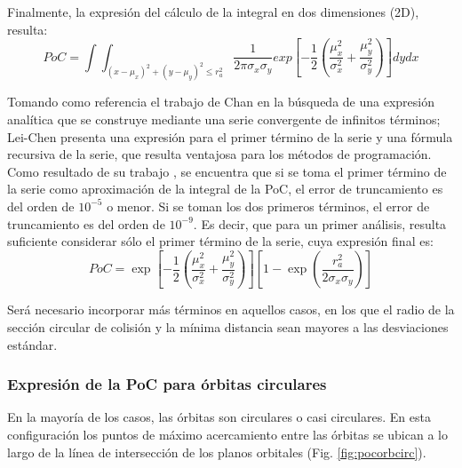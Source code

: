 Finalmente, la expresi\'on del c\'alculo de la integral en dos dimensiones (2D), resulta:\\

\begin{equation}
 PoC=\int \int_{(x-\mu_{x})^{2}+(y-\mu_{y})^{2}\leq r_{a}^{2}} \frac{1}{2\pi\sigma_{x}\sigma_{y}} exp [-\frac{1}{2}(\frac{\mu_{x}^{2}}{\sigma_{x}^{2}}+\frac{\mu_{y}^{2}}{\sigma_{y}^{2}}) ] dy dx
 \label{eq:pocintegral}
\end{equation}

Tomando como referencia el trabajo de Chan \citep{chan2003improved} en la b\'usqueda de una expresi\'on anal\'itica que se construye mediante una serie convergente de infinitos t\'erminos; Lei-Chen presenta una expresi\'on para el primer t\'ermino de la serie y una f\'ormula recursiva de la serie, que resulta ventajosa para los m\'etodos de programaci\'on.\\

Como resultado de su trabajo \citep{lei2009rapid}, se encuentra que si se toma el primer t\'ermino de la serie como aproximaci\'on de la integral de la PoC,  el error de truncamiento es del orden de $10^{-5}$ o menor. Si se toman los dos primeros t\'erminos, el error de truncamiento es del orden de $10^{-9}$. Es decir, que para un primer an\'alisis, resulta suficiente considerar s\'olo el primer t\'ermino de la serie, cuya expresi\'on final es:\\


\begin{equation}
 PoC= \exp[-\frac{1}{2}(\frac{\mu_{x}^{2}}{\sigma_{x}^{2}}+\frac{\mu_{y}^{2}}{\sigma_{y}^{2}})][1-\exp(\frac{r_{a}^{2}}{2\sigma_{x}\sigma_{y}})]
 \label{eq:pocexpress}
\end{equation}

Ser\'a necesario incorporar m\'as t\'erminos en aquellos casos, en los que el radio de la secci\'on circular de colisi\'on y la m\'inima distancia sean mayores a las desviaciones est\'andar.

\subsubsection*{Expresi\'on de la PoC para \'orbitas circulares}

En la mayor\'ia de los casos, las \'orbitas son circulares o casi circulares. En esta configuraci\'on  los puntos de m\'aximo acercamiento entre las \'orbitas se ubican a lo largo de la l\'inea de intersecci\'on de los planos orbitales (Fig. \ref{fig:pocorbcirc}).\\ 

